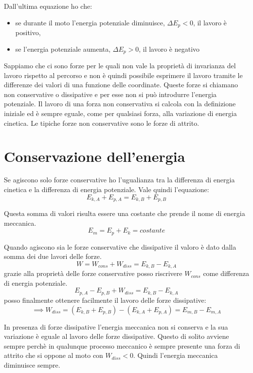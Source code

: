 \documentclass[class=book, crop=false, oneside, 12pt]{standalone}
\begin{document}
Dall'ultima equazione ho che:
\begin{itemize}
    \item se durante il moto l'energia potenziale diminuisce, \(\Delta E_p <0\), il lavoro è positivo, 
    \item se l'energia potenziale aumenta, \(\Delta E_p >0\), il lavoro è negativo
\end{itemize}

Sappiamo che ci sono forze per le quali non vale la proprietà di invarianza del lavoro rispetto al percorso e non è quindi possibile esprimere il lavoro tramite le differenze dei valori di una funzione delle coordinate. 
Queste forze si chiamano non conservative o dissipative e per esse non si può introdurre l'energia potenziale. Il lavoro di una forza non conservativa si calcola con la definizione iniziale ed è sempre eguale, come per qualsiasi forza, alla variazione di energia cinetica.
Le tipiche forze non conservative sono le forze di attrito.

\section{Conservazione dell'energia}

Se agiscono solo forze conservative ho l'ugualianza tra la differenza di energia cinetica e la differenza di energia potenziale.
Vale quindi l'equazione:
\begin{equation}
    E_{k,A} + E_{p,A} = E_{k,B} + E_{p,B}
\end{equation}

Questa somma di valori risulta essere una costante che prende il nome di energia meccanica.
\begin{equation}
    E_m = E_p + E_k = costante
\end{equation} 

Quando agiscono sia le forze conservative che dissipative il valoro è dato dalla somma dei due lavori delle forze.
\begin{equation*}
    W = W_{cons} + W_{diss} = E_{k,B} - E_{k,A}
\end{equation*}
grazie alla proprietà delle forze conservative posso riscrivere \(W_{cons}\) come differenza di energia potenziale.
\begin{equation*}
    E_{p,A} - E_{p,B} + W_{diss} = E_{k,B} - E_{k,A}
\end{equation*}
posso finalmente ottenere facilmente il lavoro delle forze dissipative:
\begin{equation}
    \implies W_{diss} = (E_{k,B} + E_{p,B}) - (E_{k,A} + E_{p,A}) = E_{m,B} - E_{m,A}
\end{equation}

In presenza di forze dissipative l'energia meccanica non si conserva e la sua variazione è eguale al lavoro delle forze dissipative.
Questo di solito avviene sempre perchè in qualunque processo meccanico è sempre presente una forza di attrito che si oppone al moto con \(W_{diss}<0\).
Quindi l'energia meccanica diminuisce sempre.
\end{document}
